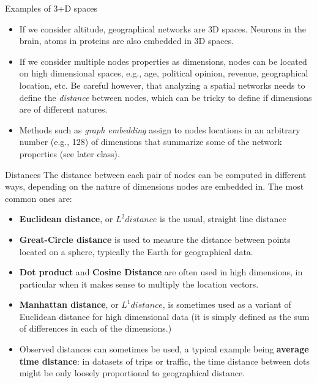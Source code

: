 \documentclass[a4paper,11pt]{book}
\begin{document}
\begin{textbox}{Examples of 3+D spaces}
\begin{itemize}
    \item If we consider altitude, geographical networks are 3D spaces. Neurons in the brain, atoms in proteins are also embedded in 3D spaces.
    \item If we consider multiple nodes properties as dimensions, nodes can be located on high dimensional spaces, e.g., age, political opinion, revenue, geographical location, etc. Be careful however, that analyzing a spatial networks needs to define the \textit{distance} between nodes, which can be tricky to define if dimensions are of different natures.
    \item Methods such as \textit{graph embedding} assign to nodes locations in an arbitrary number (e.g., 128) of dimensions that summarize some of the network properties (see later class).
\end{itemize}


\end{textbox}

\begin{textbox}{Distances}
The distance between each pair of nodes can be computed in different ways, depending on the nature of dimensions nodes are embedded in. The most common ones are:
\begin{itemize}
    \item \textbf{Euclidean distance}, or $L^2 distance$ is the usual, straight line distance
    \item \textbf{Great-Circle distance} is used to measure the distance between points located on a sphere, typically the Earth for geographical data.
    \item \textbf{Dot product} and \textbf{Cosine Distance} are often used in high dimensions, in particular when it makes sense to multiply the location vectors.
    \item \textbf{Manhattan distance}, or $L^1 distance$, is sometimes used as a variant of Euclidean distance for high dimensional data (it is simply defined as the sum of differences in each of the dimensions.)
    \item Observed distances can sometimes be used, a typical example being \textbf{average time distance}: in datasets of trips or traffic, the time distance between dots might be only loosely proportional to geographical distance.
\end{itemize}


\end{textbox}
\end{document}
